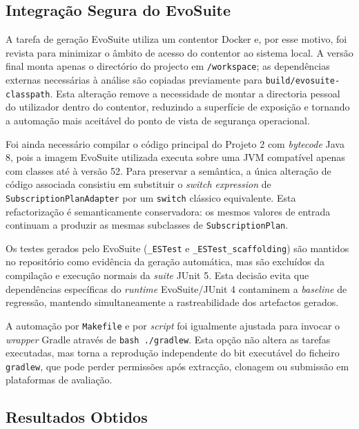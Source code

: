 \documentclass{article}
\begin{document}
\subsection{Integração Segura do EvoSuite}

A tarefa de geração EvoSuite utiliza um contentor Docker e, por esse motivo, foi revista para minimizar o âmbito de acesso do contentor ao sistema local. A versão final monta apenas o directório do projecto em \texttt{/workspace}; as dependências externas necessárias à análise são copiadas previamente para \texttt{build/evosuite-classpath}. Esta alteração remove a necessidade de montar a directoria pessoal do utilizador dentro do contentor, reduzindo a superfície de exposição e tornando a automação mais aceitável do ponto de vista de segurança operacional.

Foi ainda necessário compilar o código principal do Projeto 2 com \emph{bytecode} Java 8, pois a imagem EvoSuite utilizada executa sobre uma JVM compatível apenas com classes até à versão 52. Para preservar a semântica, a única alteração de código associada consistiu em substituir o \emph{switch expression} de \texttt{SubscriptionPlanAdapter} por um \texttt{switch} clássico equivalente. Esta refactorização é semanticamente conservadora: os mesmos valores de entrada continuam a produzir as mesmas subclasses de \texttt{SubscriptionPlan}.

Os testes gerados pelo EvoSuite (\texttt{\_ESTest} e \texttt{\_ESTest\_scaffolding}) são mantidos no repositório como evidência da geração automática, mas são excluídos da compilação e execução normais da \emph{suite} JUnit 5. Esta decisão evita que dependências específicas do \emph{runtime} EvoSuite/JUnit 4 contaminem a \emph{baseline} de regressão, mantendo simultaneamente a rastreabilidade dos artefactos gerados.

A automação por \texttt{Makefile} e por \emph{script} foi igualmente ajustada para invocar o \emph{wrapper} Gradle através de \texttt{bash ./gradlew}. Esta opção não altera as tarefas executadas, mas torna a reprodução independente do bit executável do ficheiro \texttt{gradlew}, que pode perder permissões após extracção, clonagem ou submissão em plataformas de avaliação.

\subsection{Resultados Obtidos}
\end{document}
